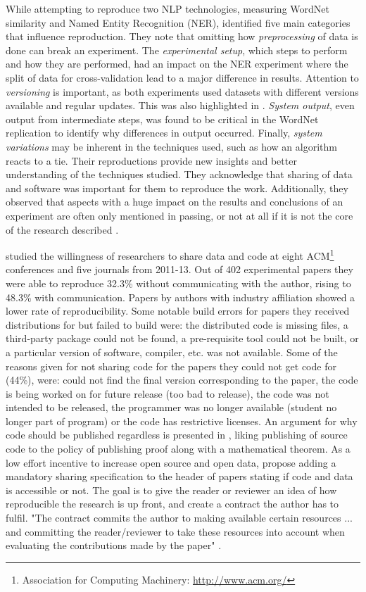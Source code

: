 While attempting to reproduce two NLP technologies, measuring WordNet similarity and Named Entity Recognition (NER), \cite{fokkens2013offspring} identified five main categories that influence reproduction. They note that omitting how \emph{preprocessing} of data is done can break an experiment. The \emph{experimental setup}, which steps to perform and how they are performed, had an impact on the NER experiment where the split of data for cross-validation lead to a major difference in results. Attention to \emph{versioning} is important, as both experiments used datasets with different versions available and regular updates. This was also highlighted in \cite{meng2015invariant}. \emph{System output}, even output from intermediate steps, was found to be critical in the WordNet replication to identify why differences in output occurred. Finally, \emph{system variations} may be inherent in the techniques used, such as how an algorithm reacts to a tie. Their reproductions provide new insights and better understanding of the techniques studied. They acknowledge that sharing of data and software was important for them to reproduce the work. Additionally, they observed that aspects with a huge impact on the results and conclusions of an experiment are often only mentioned in passing, or not at all if it is not the core of the research described \citep{fokkens2013offspring}.

\cite{Collberg2016} studied the willingness of researchers to share data and code at eight ACM\footnote{Association for Computing Machinery: \url{http://www.acm.org/}} conferences and five journals from 2011-13. Out of 402 experimental papers they were able to reproduce 32.3\% without communicating with the author, rising to 48.3\% with communication. Papers by authors with industry affiliation showed a lower rate of reproducibility. Some notable build errors for papers they received distributions for but failed to build were: the distributed code is missing files, a third-party package could not be found, a pre-requisite tool could not be built, or a particular version of software, compiler, etc. was not available. Some of the reasons given for not sharing code for the papers they could not get code for (44\%), were: could not find the final version corresponding to the paper, the code is being worked on for future release (too bad to release), the code was not intended to be released, the programmer was no longer available (student no longer part of program) or the code has restrictive licenses. An argument for why code should be published regardless is presented in \cite{leveque2013top}, liking publishing of source code to the policy of publishing proof along with a mathematical theorem. As a low effort incentive to increase open source and open data, \cite{Collberg2016} propose adding a mandatory sharing specification to the header of papers stating if code and data is accessible or not. The goal is to give the reader or reviewer an idea of how reproducible the research is up front, and create a contract the author has to fulfil. "The contract commits the author to making available certain resources ... and committing the reader/reviewer to take these resources into account when evaluating the contributions made by the paper" \citep{Collberg2016}.

